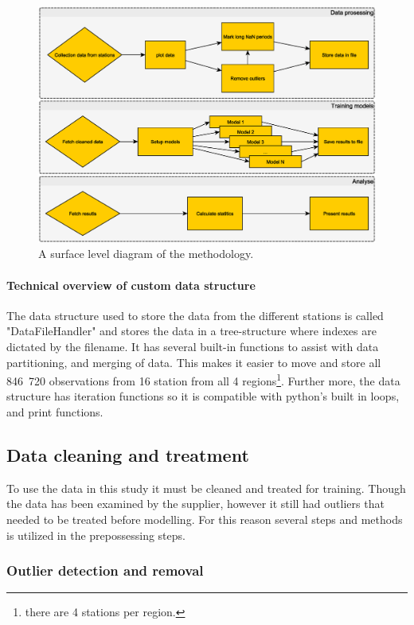 \begin{figure}
	\centering
	\includegraphics[width=0.7\linewidth]{figures/progress_diagram}
	\caption[Diagram sketching three procedures used in this study.]{A surface level diagram of the methodology.}
	\label{fig:progressdiagram}
\end{figure}

\paragraph[Data structure]{Technical overview of custom data structure}
The data structure used to store the data from the different stations is called "DataFileHandler" and stores the data in a tree-structure where indexes are dictated by the filename. It has several built-in functions to assist with data partitioning, and merging of data. This makes it easier to move and store all 846 720 observations from 16 station from all 4 regions\footnote{there are 4 stations per region.}. Further more, the data structure has iteration functions so it is compatible with python's built in loops, and print functions. 

\subsection{Data cleaning and treatment}

To use the data in this study it must be cleaned and treated for training. Though the data has been examined by the supplier, however it still had outliers that needed to be treated before modelling. For this reason several steps and methods is utilized in the prepossessing steps.

\subsubsection{Outlier detection and removal}

